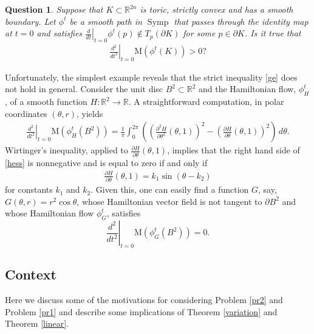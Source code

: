 \documentclass[12pt]{amsart}
\newtheorem{question}[theorem]{Question}
\theoremstyle{definition}
\newcommand\Symp{\operatorname{Symp}}
\newcommand{\RR}{{\mathbb R}}
\newcommand{\mw}{{{\mathrm {M}}}}
\begin{document}
\begin{question}\label{second} Suppose that $K \subset \RR^{2n}$ is toric, strictly convex and has a smooth boundary. Let $\phi^t$ be a smooth path in $\Symp$ that passes through the identity map at $t=0$ and satisfies $ \left.\frac{d}{dt}\right|_{t=0} \phi^t(p) \notin T_p (\partial K)$ for some $p \in \partial K$. Is it true that 
  \begin{align}\label{ge}
    \left.\frac{d^2}{dt^2}\right|_{t=0} \mw(\phi^t(K)) > 0?
\end{align}  

\end{question}

Unfortunately, the simplest example reveals that the strict inequality \eqref{ge} does not hold in general. Consider the  unit disc $B^2 \subset \RR^2$ and the Hamiltonian flow, $\phi^t_H$, of a smooth function $H \colon \RR^2 \to \RR$. A straightforward computation, in polar coordinates $(\theta,r)$, yields
\begin{align}\label{hess}
    \left.\frac{d^2}{dt^2}\right|_{t=0} \mw(\phi_H^t(B^2)) = \frac{1}{\pi}\int_0^{2\pi} \left( \left(\frac{\partial^2H}{\partial \theta^2}(\theta,1)\right)^2-\left(\frac{\partial H}{\partial \theta}(\theta,1)\right)^2 \right)\, d \theta.
\end{align} 
Wirtinger's inequality, applied to $\frac{\partial H}{\partial \theta}(\theta,1)$, implies that the right hand side of \eqref{hess} is nonnegative and is equal to zero if and only if \begin{align*} \frac{\partial H}{\partial \theta}(\theta,1) =k_1 \sin (\theta -k_2)\end{align*} for constants $k_1$ and $k_2$.  Given this, one can easily find a function $G$, say, $G(\theta, r) =r^2 \cos \theta$, whose Hamiltonian vector field is not tangent to $\partial B^2$ and whose Hamiltonian flow $\phi^t_G$, satisfies
$$
 \left.\frac{d^2}{dt^2}\right|_{t=0} \mw(\phi_G^t(B^2)) = 0.
$$



    


\subsection{Context}
Here we discuss some of the motivations for considering Problem \ref{pr2} and  Problem \ref{pr1} and describe some implications of Theorem \ref{variation} and Theorem \ref{linear}.
\end{document}
